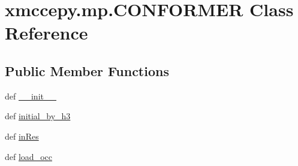 \hypertarget{classxmccepy_1_1mp_1_1_c_o_n_f_o_r_m_e_r}{\section{xmccepy.\-mp.\-C\-O\-N\-F\-O\-R\-M\-E\-R Class Reference}
\label{classxmccepy_1_1mp_1_1_c_o_n_f_o_r_m_e_r}
}
\subsection*{Public Member Functions}
\begin{DoxyCompactItemize}
\item 
def \hyperlink{classxmccepy_1_1mp_1_1_c_o_n_f_o_r_m_e_r_a371854582bd48c21b894a085ec7a9ee4}{\-\_\-\-\_\-init\-\_\-\-\_\-}
\item 
def \hyperlink{classxmccepy_1_1mp_1_1_c_o_n_f_o_r_m_e_r_a2045e40a7a38d8b544c57602d96d25e5}{initial\-\_\-by\-\_\-h3}
\item 
def \hyperlink{classxmccepy_1_1mp_1_1_c_o_n_f_o_r_m_e_r_a0c0b2d9ce8d8fb9e60edf81e618f082e}{in\-Res}
\item 
def \hyperlink{classxmccepy_1_1mp_1_1_c_o_n_f_o_r_m_e_r_a0cce02a0def0a04375125568491cc635}{load\-\_\-occ}
\end{DoxyCompactItemize}
